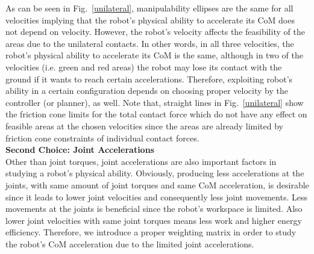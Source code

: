 As can be seen in Fig.~\ref{unilateral}, manipulability ellipses are the same
for all velocities implying that the robot's physical ability to accelerate
its CoM does not depend on velocity.  However, the robot's velocity affects
the feasibility of the areas due to the unilateral contacts.  In other words,
in all three velocities, the robot's physical ability to accelerate its CoM is
the same, although in two of the velocities (i.e. green and red areas) the
robot may lose its contact with the ground if it wants to reach certain
accelerations.  Therefore, exploiting robot's ability in a certain
configuration depends on choosing proper velocity by the controller (or
planner), as well.  Note that, straight lines in Fig.~\ref{unilateral} show
the friction cone limits for the total contact force which do not have any
effect on feasible areas at the chosen velocities since the areas are already
limited by friction cone constraints of individual contact forces.\\


\textbf{Second Choice: Joint Accelerations}\\
\label{subsec:2ndchoice}
Other than joint torques, joint accelerations are also important factors in
studying a robot's physical ability.  Obviously, producing less accelerations
at the joints, with same amount of joint torques and same CoM acceleration, is
desirable since it leads to lower joint velocities and consequently less joint
movements.  Less movements at the joints is beneficial since the robot's
workspace is limited.  Also lower joint velocities with same joint torques
means less work and higher energy efficiency.  Therefore, we introduce a
proper weighting matrix in order to study the robot's CoM acceleration due to
the limited joint accelerations.


